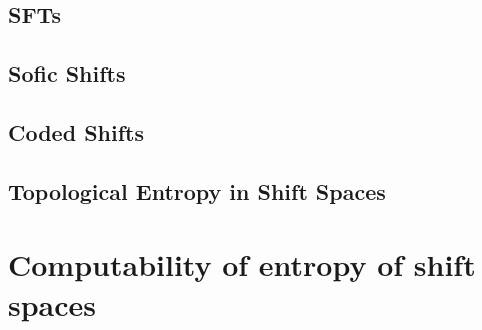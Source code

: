 \documentclass[11pt, reqno]{amsart}
\theoremstyle{plain}
\numberwithin{thm}{subsection}
\theoremstyle{definition}
\begin{document}




\subsection{SFTs}
\subsection{Sofic Shifts}
\subsection{Coded Shifts}\cite[L8]{wolf}

\subsection{Topological Entropy in Shift Spaces}\cite[L5]{wolf}



\newpage

\section{Computability of entropy of shift spaces}
\end{document}
